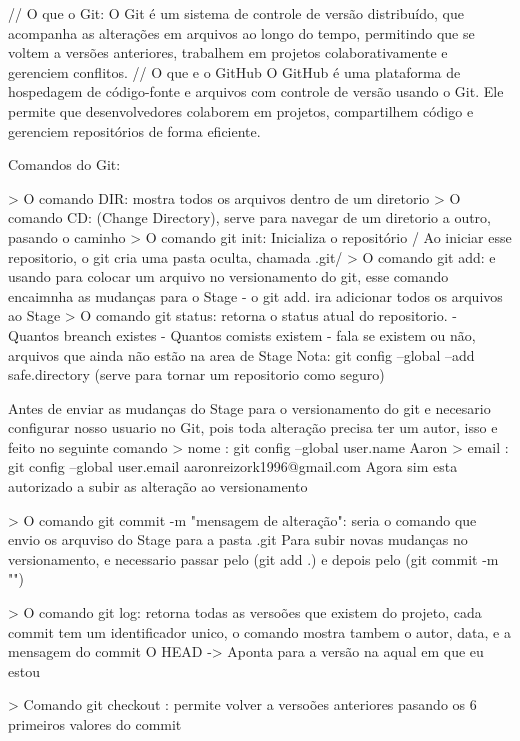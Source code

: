 // O que o Git:
O Git é um sistema de controle de versão distribuído, que acompanha as alterações em arquivos ao longo do tempo, 
permitindo que se voltem a versões anteriores, trabalhem em projetos colaborativamente e gerenciem conflitos.
// O que e o GitHub
O GitHub é uma plataforma de hospedagem de código-fonte e arquivos com controle de versão usando o Git. 
Ele permite que desenvolvedores colaborem em projetos, compartilhem código e gerenciem repositórios de forma eficiente.

Comandos do Git:

> O comando DIR: mostra todos os arquivos dentro de um diretorio
> O comando CD: (Change Directory), serve para navegar de um diretorio a outro, pasando o caminho
> O comando git init: Inicializa o repositório / Ao iniciar esse repositorio, o git cria uma pasta oculta, chamada .git/
> O comando git add:  e usando para colocar um arquivo no versionamento do git, esse comando encaimnha as mudanças para o Stage
    - o git add. ira adicionar todos os arquivos ao Stage 
> O comando git status: retorna o status atual do repositorio. 
    - Quantos breanch existes
    - Quantos comists existem
    - fala se existem ou não, arquivos que ainda não estão na area de Stage
Nota: git config --global --add safe.directory (serve para tornar um repositorio como seguro)

Antes de enviar as mudanças do Stage para o versionamento do git e necesario configurar nosso
usuario no Git, pois toda alteração precisa ter um autor, isso e feito no seguinte comando
> nome : git config --global user.name Aaron
> email : git config --global user.email aaronreizork1996@gmail.com
Agora sim esta autorizado a subir as alteração ao versionamento

> O comando git commit -m "mensagem de alteração": seria  o comando que envio os arquviso do Stage para a pasta .git
Para subir novas mudanças no versionamento, e necessario passar pelo (git add .) e depois pelo (git commit -m "")

> O comando git log: retorna todas as versoões que existem do projeto, cada commit tem um identificador
unico, o comando mostra tambem o autor, data, e a mensagem do commit 
O HEAD -> Aponta para a versão na aqual em que eu estou 

> Comando git checkout : permite volver a versoões anteriores pasando os 6 primeiros valores do commit

 